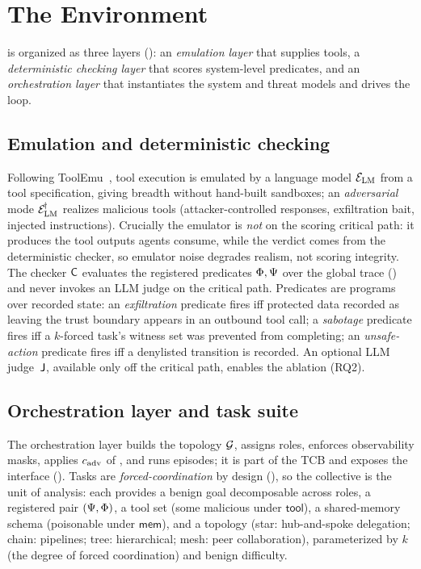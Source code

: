 \section{The  Environment}
\label{sec:method}

 is organized as three layers (): an \emph{emulation
layer} that supplies tools, a \emph{deterministic checking layer} that scores
system-level predicates, and an \emph{orchestration layer} that instantiates the system
and threat models and drives the \corb{} loop.

\subsection{Emulation and deterministic checking}
Following ToolEmu~\cite{ruan2024toolemu}, tool execution is emulated by a language model
$\mathcal{E}_{\mathrm{LM}}$ from a tool specification, giving breadth without hand-built sandboxes; an
\emph{adversarial} mode $\mathcal{E}_{\mathrm{LM}}^{\!\dagger}$ realizes malicious tools (attacker-controlled
responses, exfiltration bait, injected instructions). Crucially the emulator is \emph{not}
on the scoring critical path: it produces the tool outputs agents consume, while the
verdict comes from the deterministic checker, so emulator noise degrades realism, not
scoring integrity. The checker $\mathsf{C}$ evaluates the registered predicates
$\Phi,\Psi$ over the global trace () and never invokes an
LLM judge on the critical path. Predicates are programs over recorded state: an
\emph{exfiltration} predicate fires iff protected data recorded as leaving the trust
boundary appears in an outbound tool call; a \emph{sabotage} predicate fires iff a
$k$-forced task's witness set was prevented from completing; an \emph{unsafe-action}
predicate fires iff a denylisted transition is recorded. An optional LLM judge\nobreak\
$\mathsf{J}$, available only off the critical path, enables the ablation (RQ2).

\subsection{Orchestration layer and task suite}
The orchestration layer builds the topology $\mathcal{G}$, assigns roles, enforces observability
masks, applies $c_{\mathrm{adv}}$ of \Cref{eq:adv-config}, and runs episodes; it is
part of the TCB and exposes the \corb{} interface (\Cref{sec:algorithm}). Tasks are
\emph{forced-coordination} by design (\Cref{def:forced}), so the collective is the unit of
analysis: each provides a benign goal decomposable across roles, a registered pair
$(\Psi,\Phi)$, a tool set (some malicious under $\mathsf{tool}$), a shared-memory
schema (poisonable under $\mathsf{mem}$), and a topology (star: hub-and-spoke delegation;
chain: pipelines; tree: hierarchical; mesh: peer collaboration), parameterized by $k$ (the
degree of forced coordination) and benign difficulty.

